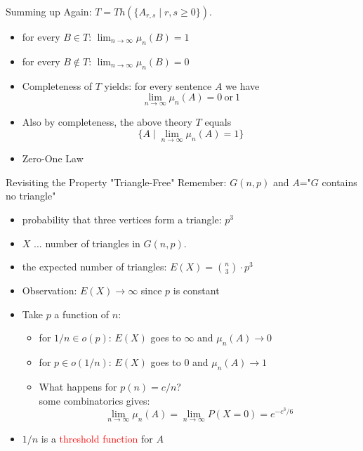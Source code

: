 \documentclass[handout]{beamer}
\renewcommand{\emph}[1]{\textcolor{red}{#1}}
\begin{document}
\begin{frame}{Summing up}
  Again: $T=Th(\{A_{r,s}\mid r,s\geq 0\})$. 
  \begin{itemize}
    \item for every $B\in T$: $\lim_{n\rightarrow\infty} \mu_n(B)=1$
    \item for every $B\notin T$: $\lim_{n\rightarrow\infty} \mu_n(B)=0$
    \item Completeness of $T$ yields: for every sentence $A$ we have
  $$\lim_{n\rightarrow\infty}\mu_n(A)=0\mathrm{\ or\ } 1$$
    \pause
    \item Also by completeness, the above theory $T$ equals
      $$\{A\mid\lim_{n\rightarrow\infty}\mu_n(A)=1\}$$
    \pause
    \item Zero-One Law
  \end{itemize}

\end{frame}



\begin{frame}{Revisiting the Property "Triangle-Free"}
  Remember: $G(n,p)$ and $A$="$G$ contains no triangle"
  \pause
  \begin{itemize}
    \item probability that three vertices form a triangle: $p^3$
    \pause
    \item $X$ ... number of triangles in $G(n,p)$.
    \item the expected number of triangles: $E(X)={n \choose 3}\cdot p^3$
    \pause
    \item Observation: $E(X)\rightarrow\infty$ since $p$ is constant
    \item Take $p$ a function of $n$:  
	\begin{itemize}
	  \item for $1/n\in o(p)$: $E(X)$ goes to $\infty$ and $\mu_n(A)\rightarrow 0$
	  \pause
	  \item for $p\in o(1/n)$: $E(X)$ goes to $0$ and $\mu_n(A)\rightarrow 1$
          \pause
          \item What happens for $p(n)=c/n$? \pause\\some combinatorics gives: 
      $$\lim_{n\rightarrow\infty}\mu_n(A)=\lim_{n\rightarrow\infty}P(X=0)=e^{-c^3/6}$$
  	\end{itemize}
    \item $1/n$ is a \emph{threshold function} for $A$
  \end{itemize}
\end{frame}
\end{document}
